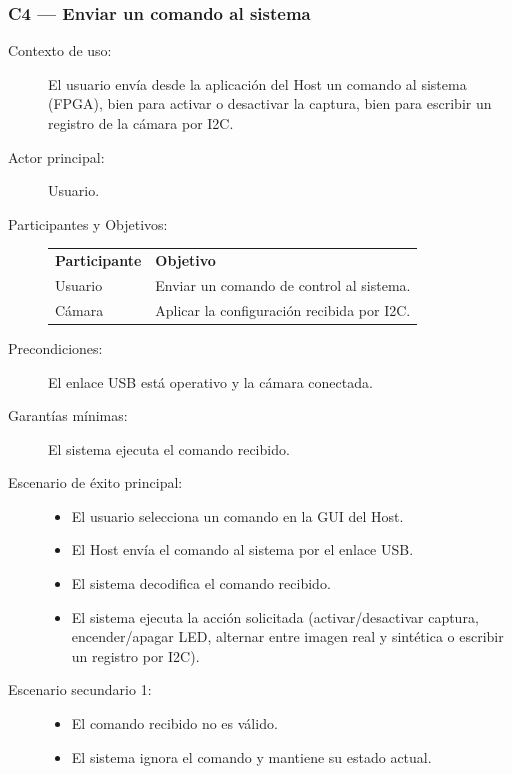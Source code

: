 \documentclass[../main.tex]{subfiles}
\begin{document}
\subsubsection{C4 --- Enviar un comando al sistema}
\begin{description}
    \item[Contexto de uso:] El usuario envía desde la aplicación del Host un comando al sistema (FPGA), bien para activar o desactivar la captura, bien para escribir un registro de la cámara por I2C.
    \item[Actor principal:] Usuario.
    \item[Participantes y Objetivos:] \hfill
        
    \begin{tabular}{>{\raggedright\arraybackslash}p{3cm}>{\raggedright\arraybackslash}p{10cm}}
    \rowcolor[HTML]{156082}
    {\color{white}\textbf{Participante}} & {\color{white}\textbf{Objetivo}} \\
    \rowcolor[HTML]{C0E6F5}
    Usuario & Enviar un comando de control al sistema. \\
    Cámara & Aplicar la configuración recibida por I2C. \\
    \end{tabular}

    \item[Precondiciones:] El enlace USB está operativo y la cámara conectada.
    \item[Garantías mínimas:] El sistema ejecuta el comando recibido.
    \item[Escenario de éxito principal:] \hfill
    \begin{itemize}
        \item El usuario selecciona un comando en la GUI del Host.
        \item El Host envía el comando al sistema por el enlace USB.
        \item El sistema decodifica el comando recibido.
        \item El sistema ejecuta la acción solicitada (activar/desactivar captura, encender/apagar LED, alternar entre imagen real y sintética o escribir un registro por I2C).
    \end{itemize}
    \item[Escenario secundario 1:] \hfill
    \begin{itemize}
        \item El comando recibido no es válido.
        \item El sistema ignora el comando y mantiene su estado actual.
    \end{itemize}
\end{description}
\end{document}
